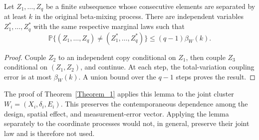 \documentclass[twoside,11pt]{article}
\newenvironment{revision}{\color{revisionred}}{}
\begin{document}
\begin{revision}
\begin{lemma}
\label{app:lem:berbee}
Let $Z_1,\ldots,Z_q$ be a finite subsequence whose consecutive elements are
separated by at least $k$ in the original beta-mixing process.  There are
independent variables $Z_1^*,\ldots,Z_q^*$ with the same respective marginal
laws such that
\[
 \mathbb P\{(Z_1,\ldots,Z_q)\ne(Z_1^*,\ldots,Z_q^*)\}
 \le(q-1)\beta_W(k).
\]
\end{lemma}

\begin{proof}
Couple $Z_2$ to an independent copy conditional on $Z_1$, then couple $Z_3$
conditional on $(Z_1,Z_2)$, and continue.  At each step, the total-variation
coupling error is at most $\beta_W(k)$.  A union bound over the $q-1$ steps
proves the result.
\end{proof}

The proof of Theorem~\ref{Theorem_1} applies this lemma to the joint cluster
$W_i=(X_i,\delta_i,E_i)$.  This preserves the contemporaneous dependence among
the design, spatial effect, and measurement-error vector.  Applying the lemma
separately to the coordinate processes would not, in general, preserve their
joint law and is therefore not used.

\end{revision}

\clearpage
\end{document}
